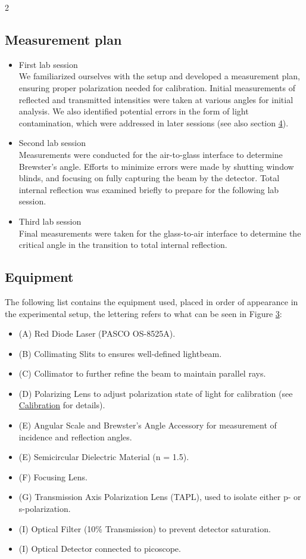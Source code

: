 \documentclass[a4paper,oneside,article]{memoir}
\begin{document}
\begin{multicols}{2}
\subsection{Measurement plan}
\begin{itemize}
    \item First lab session 
    \\
    We familiarized ourselves with the setup and developed a measurement plan, ensuring proper polarization needed for calibration. Initial measurements of reflected and transmitted intensities were taken at various angles for initial analysis. We also identified potential errors in the form of light contamination, which were addressed in later sessions (see also section \hyperref[sec:dis]{4}).
    \item Second lab session
    \\
    Measurements were conducted for the air-to-glass interface to determine Brewster’s angle. Efforts to minimize errors were made by shutting window blinds, and focusing on fully capturing the beam by the detector. Total internal reflection was examined briefly to prepare for the following lab session.
    \item Third lab session
    \\
    Final measurements were taken for the glass-to-air interface to determine the critical angle in the transition to total internal reflection.
\end{itemize}

\subsection{Equipment} \label{sec:equ}
The following list contains the equipment used, placed in order of appearance in the experimental setup, the lettering refers to what can be seen in Figure \hyperref[fig:setup]{3}:
\begin{itemize}
    \item (A) Red Diode Laser (PASCO OS-8525A).
    \item (B) Collimating Slits to ensures well-defined lightbeam.
    \item (C) Collimator to further refine the beam to maintain parallel rays.
    \item (D) Polarizing Lens to adjust polarization state of light for calibration (see \hyperref[sec:cal]{Calibration} for details).
    \item (E) Angular Scale and Brewster's Angle Accessory for measurement of incidence and reflection angles.
    \item (E) Semicircular Dielectric Material (n = 1.5).
    \item (F) Focusing Lens.
    \item (G) Transmission Axis Polarization Lens (TAPL), used to isolate either p- or s-polarization. 
    \item (I) Optical Filter (10\% Transmission) to prevent detector saturation.
    \item (I) Optical Detector connected to picoscope.
\end{itemize}


\end{multicols}
\end{document}
